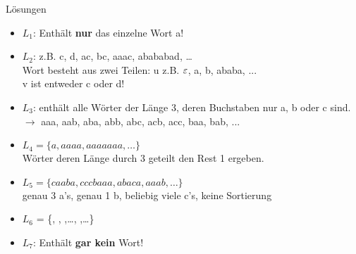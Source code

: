 {
\begin{frame}{Lösungen}
  \begin{itemize}[<+- | alert@+>]
        \item 
            $L_1$: Enthält \textbf{nur} das einzelne Wort a!
        \item
            $L_2$: z.B. c, d, ac, bc, aaac, abababad, \dots\\
            Wort besteht aus zwei Teilen: u z.B. $\varepsilon$, a, b, ababa, ...\\ v ist entweder c oder d!
        \item
            $L_3$: enthält alle Wörter der Länge 3, deren Buchstaben nur a, b oder c sind.\\
            $\rightarrow$ aaa, aab, aba, abb, abc, acb, acc, baa, bab, ...
        \item
            $L_4 = \{a, aaaa, aaaaaaa, \dots\}$\\
            Wörter deren Länge durch 3 geteilt den Rest 1 ergeben.
        \item
            $L_5 = \{caaba, cccbaaa, abaca, aaab, \dots\}$\\
            genau 3 a's, genau 1 b, beliebig viele c's, keine Sortierung
        \item
            $L_6$ = \{\Stopsign, \Rewind \Stopsign, \MoveUp \Stopsign,\dots\;, \MoveDown \Rewind \MoveDown \Stopsign,\dots\}
            \item $L_7$: Enthält \textbf{gar kein} Wort!
    \end{itemize}
\end{frame}
}
